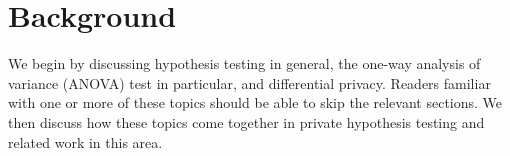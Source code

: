 \documentclass[USenglish,oneside]{article}
\newcounter{ag}
\newcounter{ab}
\newcounter{ar}
\begin{document}



\section{Background}
\label{sec:background}
We begin by discussing hypothesis testing in general, the one-way analysis of variance (ANOVA) test in particular, and differential privacy.  Readers familiar with one or more of these topics should be able to skip the relevant sections.  We then discuss how these topics come together in private hypothesis testing and related work in this area.
\end{document}
